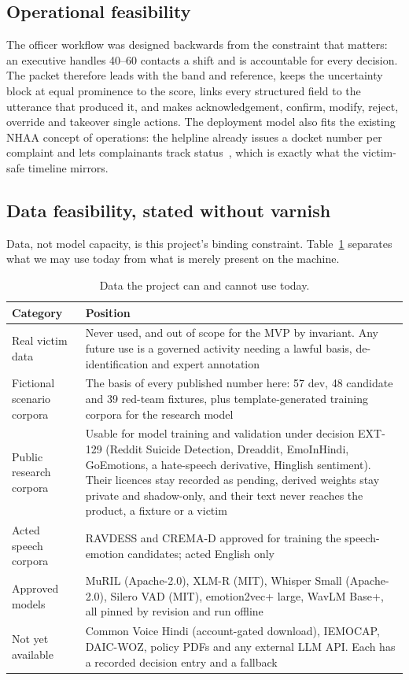 \documentclass[11pt,a4paper]{article}
\begin{document}
\subsection{Operational feasibility}
The officer workflow was designed backwards from the constraint that matters: an executive handles
40--60 contacts a shift and is accountable for every decision. The packet therefore leads with the
band and reference, keeps the uncertainty block at equal prominence to the score, links every
structured field to the utterance that produced it, and makes acknowledgement, confirm, modify,
reject, override and takeover single actions. The deployment model also fits the existing NHAA
concept of operations: the helpline already issues a docket number per complaint and lets
complainants track status~\cite{pib2021}, which is exactly what the victim-safe timeline mirrors.

\subsection{Data feasibility, stated without varnish}
Data, not model capacity, is this project's binding constraint. Table~\ref{tab:datafeas} separates
what we may use today from what is merely present on the machine.

\begin{table}[!htbp]
\centering\small
\caption{Data the project can and cannot use today.}
\label{tab:datafeas}
\begin{tabularx}{\linewidth}{@{}>{\raggedright\arraybackslash}p{4.2cm}X@{}}
\toprule
Category & Position \\
\midrule
Real victim data & Never used, and out of scope for the MVP by invariant. Any future use is a
governed activity needing a lawful basis, de-identification and expert annotation \\
Fictional scenario corpora & The basis of every published number here: 57 dev, 48 candidate and 39
red-team fixtures, plus template-generated training corpora for the research model \\
Public research corpora & Usable for model training and validation under decision EXT-129 (Reddit
Suicide Detection, Dreaddit, EmoInHindi, GoEmotions, a hate-speech derivative, Hinglish sentiment).
Their licences stay recorded as pending, derived weights stay private and shadow-only, and their text
never reaches the product, a fixture or a victim \\
Acted speech corpora & RAVDESS and CREMA-D approved for training the speech-emotion candidates; acted
English only \\
Approved models & MuRIL (Apache-2.0), XLM-R (MIT), Whisper Small (Apache-2.0), Silero VAD (MIT),
emotion2vec+ large, WavLM Base+, all pinned by revision and run offline \\
Not yet available & Common Voice Hindi (account-gated download), IEMOCAP, DAIC-WOZ, policy PDFs and any
external LLM API. Each has a recorded decision entry and a fallback \\
\bottomrule
\end{tabularx}
\end{table}
\end{document}
